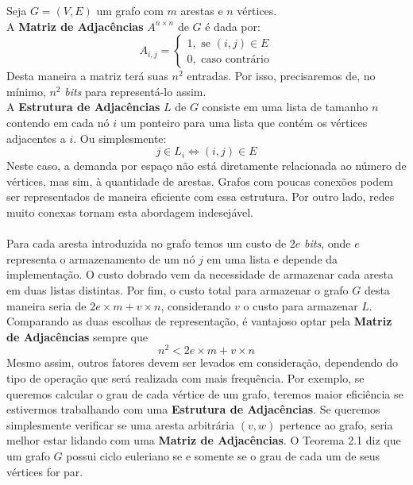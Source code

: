 \documentclass{homework}
\begin{document}
	\quest
	Seja $G = (V, E)$ um grafo com $m$ arestas e $n$ vértices.\\
	
	\subsubquest A \textbf{Matriz de Adjacências} $A^{n \times n}$ de $G$ é dada por:
		\[A_{i,j} = \begin{cases}
			1, \text{ se } (i, j) \in E\\
			0, \text{ caso contrário}
		\end{cases}\]
	Desta maneira a matriz terá suas $n^2$ entradas. Por isso, precisaremos de, no mínimo, $n^2$ \emph{bits} para representá-lo assim.\\
	
	\subsubquest A \textbf{Estrutura de Adjacências} $L$ de $G$ consiste em uma lista de tamanho $n$ contendo em cada nó $i$ um ponteiro para uma lista que contém os vértices adjacentes a $i$. Ou simplesmente:
		$$j \in L_i \iff (i, j) \in E$$
	Neste caso, a demanda por espaço não está diretamente relacionada ao número de vértices, mas sim, à quantidade de arestas. Grafos com poucas conexões podem ser representados de maneira eficiente com essa estrutura. Por outro lado, redes muito conexas tornam esta abordagem indesejável.\\
	\\
	Para cada aresta introduzida no grafo temos um custo de $2e$ \emph{bits}, onde $e$ representa o armazenamento de um nó $j$ em uma lista e depende da implementação. O custo dobrado vem da necessidade de armazenar cada aresta em duas listas distintas. Por fim, o custo total para armazenar o grafo $G$ desta maneira seria de $2e \times m + v \times n$, considerando $v$ o custo para armazenar $L$.\\
	
	\subsubquest Comparando as duas escolhas de representação, é vantajoso optar pela \textbf{Matriz de Adjacências} sempre que
		$$n^2 < 2e \times m + v \times n$$
	Mesmo assim, outros fatores devem ser levados em consideração, dependendo do tipo de operação que será realizada com mais frequência. Por exemplo, se queremos calcular o grau de cada vértice de um grafo, teremos maior eficiência se estivermos trabalhando com uma \textbf{Estrutura de Adjacências}. Se queremos simplesmente verificar se uma aresta arbitrária $(v, w)$ pertence ao grafo, seria melhor estar lidando com uma \textbf{Matriz de Adjacências}.
	\quest
	O Teorema 2.1\cite{jayme:18} diz que um grafo $G$ possui ciclo euleriano se e somente se o grau de cada um de seus vértices for par.\par
	
\end{document}
